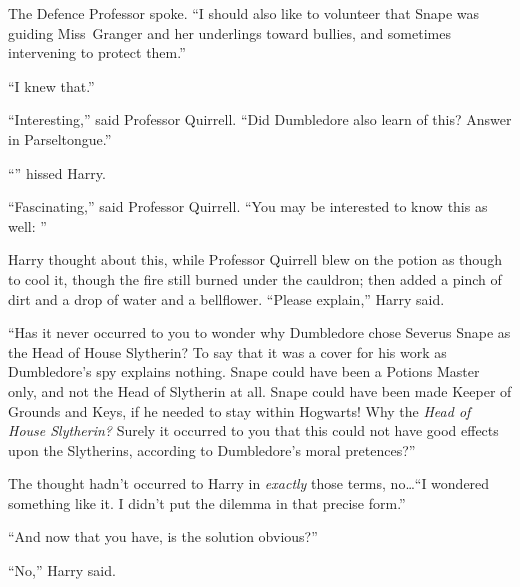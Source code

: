 The Defence Professor spoke. “I should also like to volunteer that Snape was guiding Miss~Granger and her underlings toward bullies, and sometimes intervening to protect them.”

“I knew that.”

“Interesting,” said Professor Quirrell. “Did Dumbledore also learn of this? Answer in Parseltongue.”

“” hissed Harry.

“Fascinating,” said Professor Quirrell. “You may be interested to know this as well: ”

Harry thought about this, while Professor Quirrell blew on the potion as though to cool it, though the fire still burned under the cauldron; then added a pinch of dirt and a drop of water and a bellflower. “Please explain,” Harry said.

“Has it never occurred to you to wonder why Dumbledore chose Severus Snape as the Head of House Slytherin? To say that it was a cover for his work as Dumbledore’s spy explains nothing. Snape could have been a Potions Master only, and not the Head of Slytherin at all. Snape could have been made Keeper of Grounds and Keys, if he needed to stay within Hogwarts! Why the \emph{Head of House Slytherin?} Surely it occurred to you that this could not have good effects upon the Slytherins, according to Dumbledore’s moral pretences?”

The thought hadn’t occurred to Harry in \emph{exactly} those terms, no…“I wondered something like it. I didn’t put the dilemma in that precise form.”

“And now that you have, is the solution obvious?”

“No,” Harry said.

